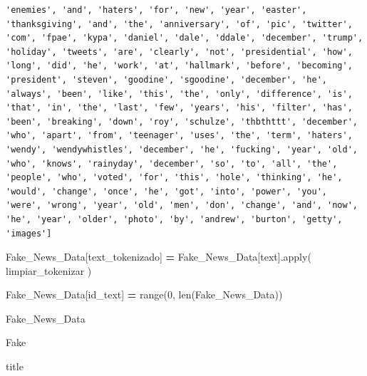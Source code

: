 \documentclass[
  11pt,
  a4paper,
]{article}
\newenvironment{Shaded}{\begin{snugshade}}{\end{snugshade}}
\newcommand{\BuiltInTok}[1]{#1}
\newcommand{\DecValTok}[1]{\textcolor[rgb]{0.00,0.00,0.81}{#1}}
\newcommand{\NormalTok}[1]{#1}
\newcommand{\OperatorTok}[1]{\textcolor[rgb]{0.81,0.36,0.00}{\textbf{#1}}}
\newcommand{\StringTok}[1]{\textcolor[rgb]{0.31,0.60,0.02}{#1}}
\begin{document}
\begin{verbatim}
'enemies', 'and', 'haters', 'for', 'new', 'year', 'easter', 'thanksgiving', 'and', 'the', 'anniversary', 'of', 'pic', 'twitter', 'com', 'fpae', 'kypa', 'daniel', 'dale', 'ddale', 'december', 'trump', 'holiday', 'tweets', 'are', 'clearly', 'not', 'presidential', 'how', 'long', 'did', 'he', 'work', 'at', 'hallmark', 'before', 'becoming', 'president', 'steven', 'goodine', 'sgoodine', 'december', 'he', 'always', 'been', 'like', 'this', 'the', 'only', 'difference', 'is', 'that', 'in', 'the', 'last', 'few', 'years', 'his', 'filter', 'has', 'been', 'breaking', 'down', 'roy', 'schulze', 'thbthttt', 'december', 'who', 'apart', 'from', 'teenager', 'uses', 'the', 'term', 'haters', 'wendy', 'wendywhistles', 'december', 'he', 'fucking', 'year', 'old', 'who', 'knows', 'rainyday', 'december', 'so', 'to', 'all', 'the', 'people', 'who', 'voted', 'for', 'this', 'hole', 'thinking', 'he', 'would', 'change', 'once', 'he', 'got', 'into', 'power', 'you', 'were', 'wrong', 'year', 'old', 'men', 'don', 'change', 'and', 'now', 'he', 'year', 'older', 'photo', 'by', 'andrew', 'burton', 'getty', 'images']
\end{verbatim}

\begin{Shaded}
\begin{Highlighting}[]
\NormalTok{Fake\_News\_Data[}\StringTok{\textquotesingle{}text\_tokenizado\textquotesingle{}}\NormalTok{] }\OperatorTok{=}\NormalTok{ Fake\_News\_Data[}\StringTok{\textquotesingle{}text\textquotesingle{}}\NormalTok{].}\BuiltInTok{apply}\NormalTok{( limpiar\_tokenizar )}
\end{Highlighting}
\end{Shaded}

\begin{Shaded}
\begin{Highlighting}[]
\NormalTok{Fake\_News\_Data[}\StringTok{\textquotesingle{}id\_text\textquotesingle{}}\NormalTok{] }\OperatorTok{=} \BuiltInTok{range}\NormalTok{(}\DecValTok{0}\NormalTok{, }\BuiltInTok{len}\NormalTok{(Fake\_News\_Data))}
\end{Highlighting}
\end{Shaded}

\begin{Shaded}
\begin{Highlighting}[]
\NormalTok{Fake\_News\_Data}
\end{Highlighting}
\end{Shaded}

Fake

title
\end{document}
